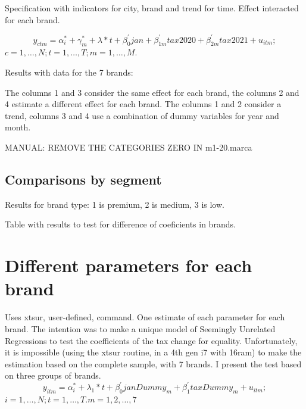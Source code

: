 \documentclass[]{article}
\begin{document}
Specification with indicators for city, brand and trend for time.
Effect interacted for each brand.

\begin{equation*} 
	y_{ctm}  = \alpha_{i}^{*} + \gamma_{m}^{*} + \lambda*t + \beta_{0}^{'}jan + \beta_{1m}^{'}tax2020 + \beta_{2m}^{'}tax2021 + u_{itm}
	;   \tag{2.2}
\end{equation*}
$c  = 1,\ldots,N;  t=1,\ldots,T; m=1,\ldots,M. $

Results with data for the 7 brands:



The columns 1 and 3 consider the same effect for each brand, the columns 2 and 4 estimate a different effect for each brand. The columns 1 and 2 consider a trend, columns 3 and 4 use a combination of dummy variables for year and month.

MANUAL: REMOVE THE CATEGORIES ZERO IN m1-20.marca

\subsection{Comparisons by segment}

Results for brand type: 1 is premium, 2 is medium, 3 is low.



Table with results to test for difference of coeficients in brands.

\begin{landscape}
	
\end{landscape}


\section{Different parameters for each brand}
Uses xtsur, user-defined, command.
One estimate of each parameter for each brand. 
The intention was to make a unique model of Seemingly Unrelated Regressions to test the coefficients of the tax change for equality. 
Unfortunately, it is impossible (using the xtsur routine, in a 4th gen i7 with 16ram) to make the estimation based on the complete sample, with 7 brands. I present the test based on three groups of brands.
\begin{equation*} 
	y_{itm}  = \alpha_{i}^{*} + \lambda_{1}*t +\beta_{0}^{'}janDummy_{m} + \beta_{1}^{'}taxDummy_{m} + u_{itm}
	;  
\end{equation*}
$i  = 1,\ldots,N;  t=1,\ldots,T. m = 1,2,\ldots,7$
\end{document}

